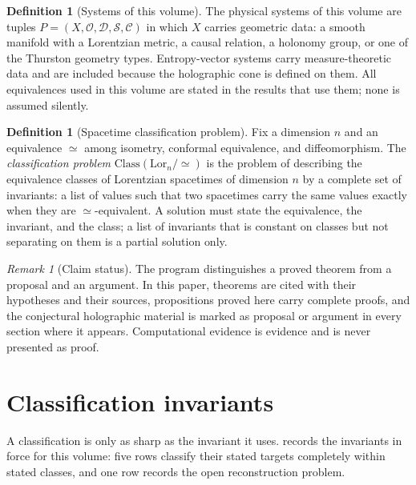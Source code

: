 \documentclass[11pt,letterpaper]{article}
\theoremstyle{definition}
\newtheorem{definition}[theorem]{Definition}
\theoremstyle{remark}
\newtheorem{remark}[theorem]{Remark}
\begin{document}
\begin{definition}[Systems of this volume]\label{def:systems}
The physical systems of this volume are tuples $P = (X, \mathcal{O}, \mathcal{D}, \mathcal{S}, \mathcal{C})$ in which $X$ carries geometric data: a smooth manifold with a Lorentzian metric, a causal relation, a holonomy group, or one of the Thurston geometry types. Entropy-vector systems carry measure-theoretic data and are included because the holographic cone is defined on them. All equivalences used in this volume are stated in the results that use them; none is assumed silently.
\end{definition}

\begin{definition}[Spacetime classification problem]\label{def:classify}
Fix a dimension $n$ and an equivalence $\simeq$ among isometry, conformal equivalence, and diffeomorphism. The \emph{classification problem} $\mathrm{Class}(\mathrm{Lor}_n / \simeq)$ is the problem of describing the equivalence classes of Lorentzian spacetimes of dimension $n$ by a complete set of invariants: a list of values such that two spacetimes carry the same values exactly when they are $\simeq$-equivalent. A solution must state the equivalence, the invariant, and the class; a list of invariants that is constant on classes but not separating on them is a partial solution only.
\end{definition}

\begin{remark}[Claim status]\label{rem:status}
The program distinguishes a proved theorem from a proposal and an argument. In this paper, theorems are cited with their hypotheses and their sources, propositions proved here carry complete proofs, and the conjectural holographic material is marked as proposal or argument in every section where it appears. Computational evidence is evidence and is never presented as proof.
\end{remark}

\section{Classification invariants}

A classification is only as sharp as the invariant it uses.  records the invariants in force for this volume: five rows classify their stated targets completely within stated classes, and one row records the open reconstruction problem.
\end{document}

